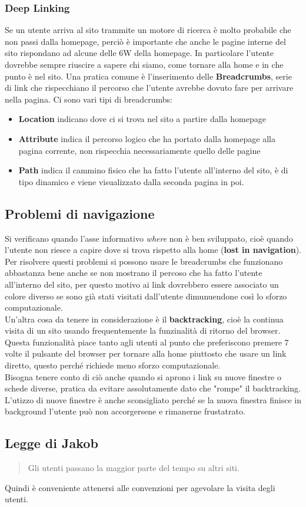 \subsubsection{Deep Linking}
Se un utente arriva al sito trammite un motore di ricerca è molto probabile che non passi dalla homepage, perciò è importante che anche le pagine interne del sito rispondano ad alcune delle 6W della homepage.
In particolare l'utente dovrebbe sempre riuscire a sapere chi siamo, come tornare alla home e in che punto è nel sito.
Una pratica comune è l'inserimento delle \textbf{Breadcrumbs}, serie di link che rispecchiano il percorso che l'utente avrebbe dovuto fare per arrivare nella pagina.
Ci sono vari tipi di breadcrumbs:
\begin{itemize}
\item \textbf{Location} indicano dove ci si trova nel sito a partire dalla homepage
\item \textbf{Attribute} indica il percorso logico che ha portato dalla homepage alla pagina corrente, non rispecchia necessariamente quello delle pagine
\item \textbf{Path} indica il cammino fisico che ha fatto l'utente all'interno del sito, è di tipo dinamico e viene visualizzato dalla seconda pagina in poi.
\end{itemize}

\subsection{Problemi di navigazione}
Si verificano quando l'asse informativo \textit{where} non è ben sviluppato, cioè quando l'utente non riesce a capire dove si trova rispetto alla home (\textbf{lost in navigation}).
Per risolvere questi problemi si possono usare le breadcrumbs che funzionano abbastanza bene anche se non mostrano il percoso che ha fatto l'utente all'interno del sito, per questo motivo ai link dovrebbero essere associato un colore diverso se sono già stati visitati dall'utente dimunuendone così lo sforzo computazionale. \\
Un'altra cosa da tenere in considerazione è il \textbf{backtracking}, cioè la continua visita di un sito usando frequentemente la funzinalità di ritorno del browser. Questa funzionalità piace tanto agli utenti al punto che preferiscono premere 7 volte il pulsante del browser per tornare alla home piuttosto che usare un link diretto, questo perché richiede meno sforzo computazionale.\\
Bisogna tenere conto di ciò anche quando si aprono i link su nuove finestre o schede diverse, pratica da evitare assolutamente dato che "rompe" il backtracking. L'utizzo di nuove finestre è anche sconsigliato perché se la nuova finestra finisce in background l'utente può non accorgersene e rimanerne frustatrato.

\subsection{Legge di Jakob}
\begin{quote}
Gli utenti passano la maggior parte del tempo su altri siti.
\end{quote}
Quindi è conveniente attenersi alle convenzioni per agevolare la visita degli utenti.

 

